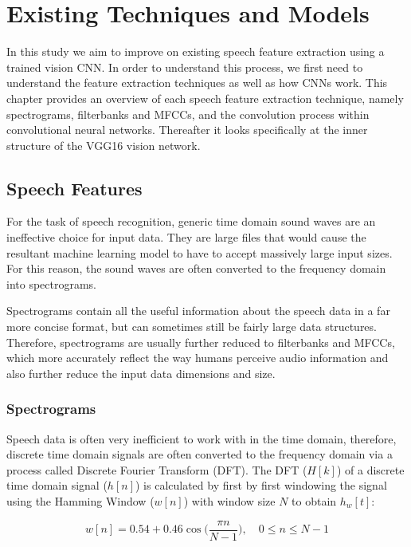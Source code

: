 \chapter{Existing Techniques and Models}

In this study we aim to improve on existing speech feature extraction using a trained vision CNN.
In order to understand this process, we first need to understand the feature extraction techniques as well as how CNNs work.
This chapter provides an overview of each speech feature extraction technique, namely spectrograms, filterbanks and MFCCs, and the convolution process within convolutional neural networks. 
Thereafter it looks specifically at the inner structure of the VGG16 vision network.

\section{Speech Features}

For the task of speech recognition, generic time domain sound waves are an ineffective choice for input data. 
They are large files that would cause the resultant machine learning model to have to accept massively large input sizes. 
For this reason, the sound waves are often converted to the frequency domain into spectrograms. 

Spectrograms contain all the useful information about the speech data in a far more concise format, but can sometimes still be fairly large data structures. 
Therefore, spectrograms are usually further reduced to filterbanks and MFCCs, which more accurately reflect the way humans perceive audio information and also further reduce the input data dimensions and size.

\subsection{Spectrograms}

Speech data is often very inefficient to work with in the time domain, therefore, discrete time domain signals are often converted to the frequency domain via a process called Discrete Fourier Transform (DFT). 
The DFT ($H[k]$) of a discrete time domain signal ($h[n]$) is calculated by first by first windowing the signal using the Hamming Window ($w[n]$) with window size $N$ to obtain $h_{w}[t]$:

\begin{equation}
    w[n] = 0.54+0.46\cos\Big(\frac{\pi n}{N-1}\Big), \quad 0 \leq n \leq N-1
\end{equation}

